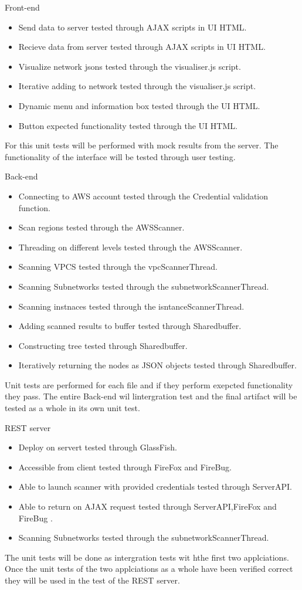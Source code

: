 \documentclass[hidelinks,a4paper,12pt]{article}
\begin{document}
Front-end
\begin{itemize}
  \item Send data to server tested through AJAX scripts in UI HTML.
  \item Recieve data from server tested through AJAX scripts in UI HTML.
  \item Visualize network jsons tested through the visualiser.js script.
  \item Iterative adding to network tested through the visualiser.js script.
  \item Dynamic menu and information box tested through the UI HTML.
  \item Button expected functionality tested through the UI HTML. 
\end{itemize}
For this unit tests will be performed with mock results from the server. The functionality of the interface will be tested through user testing.

Back-end
\begin{itemize}
  \item Connecting to AWS account tested through the Credential validation function.
  \item Scan regions tested through the AWSScanner.
  \item Threading on different levels tested through the AWSScanner.
  \item Scanning VPCS  tested through the vpcScannerThread.
   \item Scanning Subnetworks  tested through the subnetworkScannerThread.
    \item Scanning instnaces tested through the isntanceScannerThread.
  \item Adding scanned results to buffer tested through Sharedbuffer.
\item Constructing tree tested through Sharedbuffer.
  \item Iteratively returning the nodes as JSON objects tested through Sharedbuffer.
\end{itemize}
Unit tests are performed for each file and if they perform  exepcted functionality they pass. The entire Back-end wil lintergration test and the final artifact will be tested as a whole in its own unit test.

REST server
\begin{itemize}
  \item Deploy on servert tested through GlassFish.
  \item Accessible from client tested through FireFox and FireBug.
  \item Able to launch scanner with provided credentials tested through ServerAPI.
  \item Able to return on AJAX request tested through ServerAPI,FireFox and FireBug .
   \item Scanning Subnetworks  tested through the subnetworkScannerThread.
\end{itemize}
The unit tests will be done as intergration tests wit hthe first two applciations. Once the unit tests of the two applciations as a whole have been verified correct they will be used in the test of the REST server.
\end{document}
